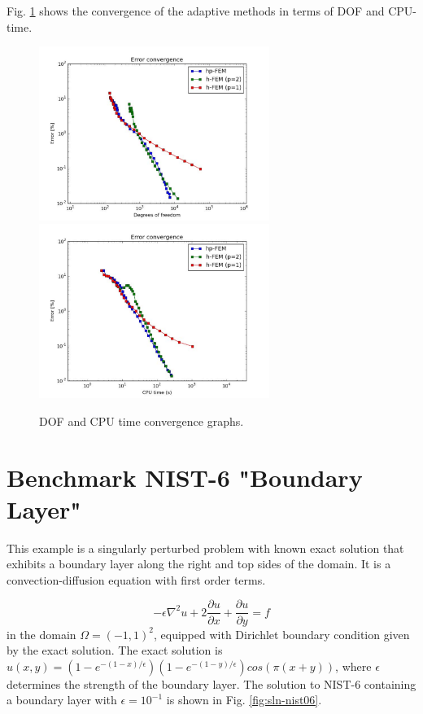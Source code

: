\documentclass[12pt]{elsarticle}
\begin{document}
Fig. \ref{fig:nist-5-conv} shows the convergence of the adaptive methods in terms of DOF and CPU-time.

\begin{figure}[H]
\centering
\hspace{-50mm}
\includegraphics[width=7.5cm]{mafig33.pdf}\ \
\hspace{-10mm}
\includegraphics[width=7.5cm]{mafig34.pdf}
\hspace{-50mm}
\vspace{-2mm}
\caption{DOF and CPU time convergence graphs.}
\label{fig:nist-5-conv}
\end{figure}


\section{Benchmark NIST-6 "Boundary Layer"}
\label{sec:bench-6}

This example is a singularly perturbed problem with known exact solution that exhibits
a boundary layer along the right and top sides of the domain.
It is a convection-diffusion equation with first order terms.

\begin{equation} \label{boundary-layer}
-\epsilon \nabla^{2} u + 2\frac{\partial u}{\partial x} + \frac{\partial u}{\partial y} = f
\end{equation}
in the domain $\Omega = (-1, 1)^2$, equipped with Dirichlet boundary condition
given by the exact solution. The exact solution is
$u(x,y) = (1 - e^{-(1 - x) / \epsilon})(1 - e^{-(1 - y) / \epsilon})cos(\pi (x + y))$,
where $\epsilon$ determines the strength of the boundary layer.
The solution to NIST-6 containing a boundary layer
with $\epsilon = 10^{-1}$ is shown in Fig. \ref{fig:sln-nist06}.
\end{document}
